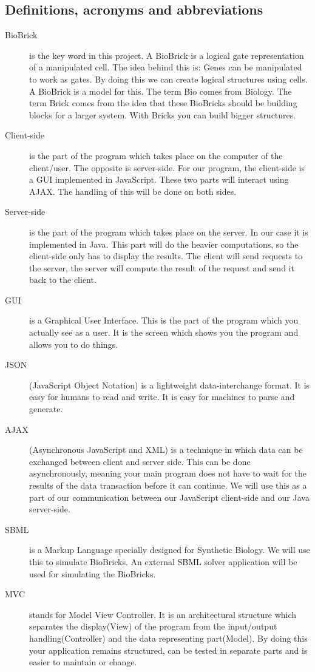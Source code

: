 \documentclass[a4paper]{article}
\begin{document}
\subsection{Definitions, acronyms and abbreviations}
\begin{description}
	\item[BioBrick] is the key word in this project. A BioBrick is a logical gate representation of a manipulated cell. The idea behind this is: Genes can be manipulated to work as gates. By doing this we can create logical structures using cells. A BioBrick is a model for this. The term Bio comes from Biology. The term Brick comes from the idea that these BioBricks should be building blocks for a larger system. With Bricks you can build bigger structures.  
	\item[Client-side] is the part of the program which takes place on the computer of the client/user. The opposite is server-side. For our program, the client-side is a GUI implemented in JavaScript. These two parts will interact using AJAX. The handling of this will be done on both sides. 
	\item[Server-side]  is the part of the program which takes place on the server. In our case it is implemented in Java. This part will do the heavier computations, so the client-side only has to display the results. The client will send requests to the server, the server will compute the result of the request and send it back to the client.
	\item[GUI] is a Graphical User Interface. This is the part of the program which you actually see as a user. It is the screen which shows you the program and allows you to do things. 
	\item[JSON] (JavaScript Object Notation) is a lightweight data-interchange format. It is easy for humans to read and write. It is easy for machines to parse and generate.
	\item[AJAX] (Asynchronous JavaScript and XML) is a technique in which data can be exchanged between client and server side. This can be done asynchronously, meaning your main program does not have to wait for the results of the data transaction before it can continue. We will use this as a part of our communication between our JavaScript client-side and our Java server-side.
	\item[SBML] is a Markup Language specially designed for Synthetic Biology. We will use this to simulate BioBricks. An external SBML solver application will be used for simulating the BioBricks.\\

	\item[MVC] stands for Model View Controller. It is an architectural structure which separates the display(View) of the program from the input/output handling(Controller) and the data representing part(Model). By doing this your application remains structured, can be tested in separate parts and is easier to maintain or change.
\end{description}
\end{document}
